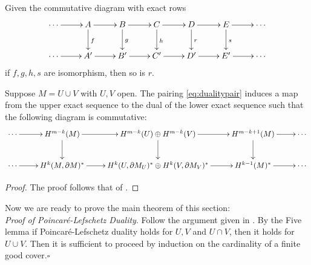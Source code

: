 \begin{lemm}
	Given the commutative diagram with exact rows
	\begin{equation}
	\xymatrix{
		\cdots \ar[r] &A \ar[d]^f \ar[r]  &B \ar[d]^g \ar[r] &C \ar[d]^h \ar[r] &D \ar[d]^r \ar[r] &E \ar[d]^s \ar[r] &\cdots\\
		\cdots \ar[r] &A' \ar[r]  &B' \ar[r] &C' \ar[r] &D' \ar[r] &E' \ar[r] &\cdots\\}
	\end{equation}
	if $f,g,h,s$ are isomorphism, then so is $r$.
	
\end{lemm}


\begin{lemm}
	Suppose $M=U\cup V$ with $U,V$ open. The pairing \eqref{eq:dualitypair} induces a map from the upper exact sequence to the dual of the lower exact sequence such that the following diagram is commutative:
	\begin{equation}
	\xymatrix{
		\cdots \ar[r] &H^{m-k}(M) \ar[d] \ar[r] &H^{m-k}(U)\oplus H^{m-k}(V)\ar[d]\ar[r] &H^{m-k+1}(M) \ar[d] \ar[r] &\cdots\\
		\cdots \ar[r] &H^{k}(M,\partial M)^*  \ar[r] &H^{k}(U,\partial M_U)^*\oplus H^{k}(V,\partial M_V)^*\ar[r] &H^{k-1}(M)^* \ar[r] &\cdots}
	\end{equation}
	
\end{lemm}


\begin{proof}
	The proof follows that of \cite[Lem. 5.6]{Bott-Tu-82}.
\end{proof}


\noindent Now we are ready to prove the main theorem of this section:\\

\noindent\textit{Proof of Poincar\'e-Lefschetz Duality}. Follow the argument given in \cite[Sec. 5]{Bott-Tu-82}. By the Five lemma if Poincar\'e-Lefschetz duality holds for $U,V$ and $U\cap V$, then it holds for $U\cup V$. Then it is sufficient to proceed by induction on the cardinality of a finite good cover.\hfill$\square$
